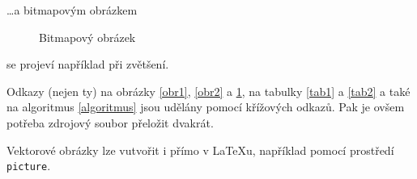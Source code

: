 \documentclass[a4paper, 11pt]{article}
\begin{document}
\dots a bitmapovým obrázkem
\begin{figure}[h]
\begin{center}
\centering
{
\caption{Bitmapový obrázek}\label{obr3}
}
\end{center}
\end{figure}

\noindent se projeví například při zvětšení.

Odkazy (nejen ty) na obrázky \ref{obr1}, \ref{obr2} a \ref{obr3}, na tabulky \ref{tab1} a \ref{tab2} a také na algoritmus \ref{algoritmus} jsou udělány pomocí křížových odkazů. Pak je ovšem potřeba zdrojový soubor přeložit dvakrát.

Vektorové obrázky lze vutvořit i přímo v \LaTeX u, například pomocí prostředí \verb|picture|.
\end{document}
